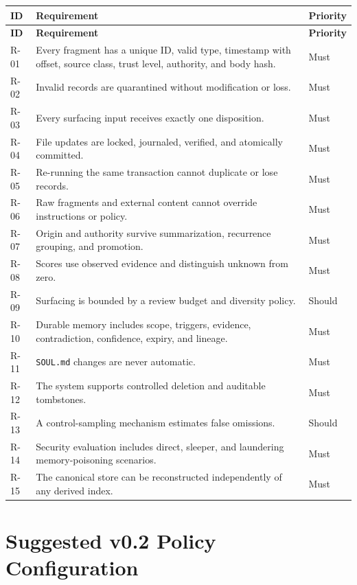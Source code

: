\documentclass[11pt,a4paper]{article}
\begin{document}
\begin{longtable}{L{0.10\textwidth}L{0.70\textwidth}L{0.12\textwidth}}
\toprule
\textbf{ID} & \textbf{Requirement} & \textbf{Priority} \\
\midrule
\endfirsthead
\toprule
\textbf{ID} & \textbf{Requirement} & \textbf{Priority} \\
\midrule
\endhead
R-01 & Every fragment has a unique ID, valid type, timestamp with offset, source class, trust level, authority, and body hash. & Must \\
R-02 & Invalid records are quarantined without modification or loss. & Must \\
R-03 & Every surfacing input receives exactly one disposition. & Must \\
R-04 & File updates are locked, journaled, verified, and atomically committed. & Must \\
R-05 & Re-running the same transaction cannot duplicate or lose records. & Must \\
R-06 & Raw fragments and external content cannot override instructions or policy. & Must \\
R-07 & Origin and authority survive summarization, recurrence grouping, and promotion. & Must \\
R-08 & Scores use observed evidence and distinguish unknown from zero. & Must \\
R-09 & Surfacing is bounded by a review budget and diversity policy. & Should \\
R-10 & Durable memory includes scope, triggers, evidence, contradiction, confidence, expiry, and lineage. & Must \\
R-11 & \texttt{SOUL.md} changes are never automatic. & Must \\
R-12 & The system supports controlled deletion and auditable tombstones. & Must \\
R-13 & A control-sampling mechanism estimates false omissions. & Should \\
R-14 & Security evaluation includes direct, sleeper, and laundering memory-poisoning scenarios. & Must \\
R-15 & The canonical store can be reconstructed independently of any derived index. & Must \\
\bottomrule
\end{longtable}

\section{Suggested v0.2 Policy Configuration}
\end{document}
